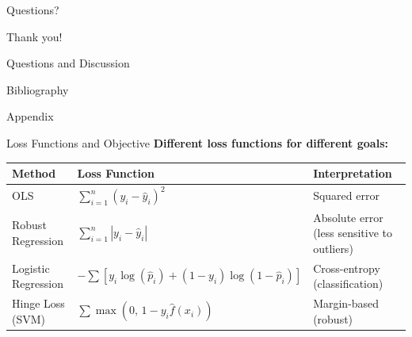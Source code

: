 \documentclass[11pt]{beamer}
\begin{document}
\begin{frame}{Questions?}
	\begin{center}
		\Large
		Thank you!
		\vspace{1cm}

		\normalsize
		Questions and Discussion
	\end{center}
\end{frame}


\begin{frame}[allowframebreaks]{Bibliography}
	\printbibliography
\end{frame}


\appendix
\setcounter{section}{0}
\setcounter{framenumber}{0}

\begin{frame}
	\begin{center}
		\Large
		Appendix
	\end{center}
\end{frame}

\begin{frame}{Loss Functions and Objective}
	\textbf{Different loss functions for different goals:}

	\vspace{0.2cm}

	\begin{table}
		\footnotesize
		\centering
		\setlength{\tabcolsep}{4pt}
		\renewcommand{\arraystretch}{1.15}
		\begin{tabular}{|p{}|p{}|p{}|}
			\hline
			\textbf{Method} & \textbf{Loss Function} & \textbf{Interpretation} \\
			\hline
			OLS & $\sum_{i=1}^n (y_i - \hat{y}_i)^2$ & Squared error \\
			\hline
			Robust Regression & $\sum_{i=1}^n |y_i - \hat{y}_i|$ & Absolute error (less sensitive to outliers) \\
			\hline
			Logistic Regression & $-\sum \left[y_i \log(\hat{p}_i) + (1-y_i)\log(1-\hat{p}_i)\right]$ & Cross-entropy (classification) \\
			\hline
			Hinge Loss (SVM) & $\sum \max(0,\, 1 - y_i \hat{f}(x_i))$ & Margin-based (robust) \\
			\hline
		\end{tabular}
	\end{table}
\end{frame}
\end{document}
